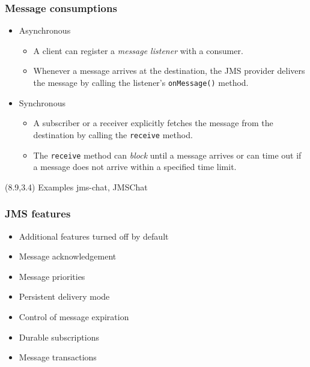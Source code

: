 \documentclass[10pt,xcolor=pdflatex]{beamer}
\begin{document}
\begin{frame}[containsverbatim]\frametitle{Message consumptions}
\begin{itemize}
	\item Asynchronous
	  \begin{itemize}
		\item A client can register a \textit{message listener} with a consumer.
		\item Whenever a message arrives at the destination, the JMS provider delivers the message by calling the listener's \texttt{onMessage()} method.
	  \end{itemize}
    \item Synchronous
      \begin{itemize}
 	   \item A subscriber or a receiver explicitly fetches the message from the destination by calling the \texttt{receive} method.
		\item The \texttt{receive} method can \textit{block} until a message arrives or can time out if a message does not arrive within a specified time limit.
      \end{itemize}
\end{itemize}
\begin{textblock}{5}(8.9,3.4)
    {\footnotesize Examples jms-chat, JMSChat}
\end{textblock}
\end{frame}


\begin{frame}[containsverbatim]\frametitle{JMS features}
\begin{itemize}
	\item Additional features turned off by default
	\item Message acknowledgement
	\item Message priorities
	\item Persistent delivery mode
	\item Control of message expiration
	\item Durable subscriptions
	\item Message transactions
\end{itemize}
\end{frame}
\end{document}
